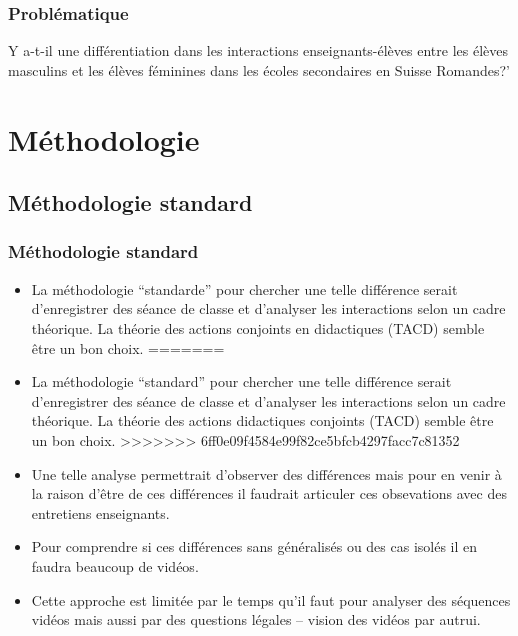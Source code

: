 \documentclass{beamer}
\begin{document}
\begin{frame}
\frametitle{Problématique}
\begin{block}{ }
Y a-t-il une différentiation dans les interactions enseignants-élèves entre les élèves masculins et les élèves féminines dans les écoles secondaires en Suisse Romandes?'
\end{block}
\end{frame}

\section{Méthodologie}
\subsection{Méthodologie standard}
\begin{frame}
\frametitle{Méthodologie standard}
\begin{itemize}
<<<<<<< HEAD
\item La méthodologie ``standarde'' pour chercher une telle différence serait d'enregistrer des séance de classe et d'analyser
les interactions selon un cadre théorique. La théorie des actions conjoints en didactiques (TACD) semble être un bon choix.
=======
\item La méthodologie ``standard'' pour chercher une telle différence serait d'enregistrer des séance de classe et d'analyser
les interactions selon un cadre théorique. La théorie des actions didactiques conjoints (TACD) semble être un bon choix.
>>>>>>> 6ff0e09f4584e99f82ce5bfcb4297facc7c81352
\item Une telle analyse permettrait d'observer des différences mais pour en venir à la raison d'être de ces différences il faudrait articuler ces obsevations avec des entretiens enseignants.
\item Pour comprendre si ces différences sans généralisés ou des cas isolés il en faudra beaucoup de vidéos.
\item Cette approche est limitée par le temps qu'il faut pour analyser des séquences vidéos mais aussi par des questions
légales -- vision des vidéos par autrui.  
\end{itemize}
\end{frame}
\end{document}
